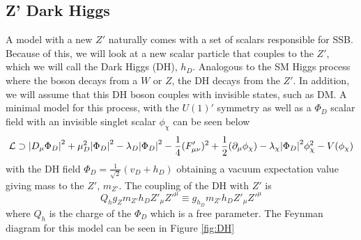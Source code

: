 \documentclass[12pt, a4paper]{book}
\begin{document}
\subsection{Z' Dark Higgs}
A model with a new $Z'$ naturally comes with a set of scalars responsible for SSB. Because of this, we will look at a new scalar particle that couples to the $Z'$, which we will call the Dark Higgs (DH), $h_D$. Analogous to the SM Higgs process where the boson decays from a $W$ or $Z$, the DH decays from the $Z'$. 
In addition, we will assume that this DH boson couples with invisible states, such as DM. A minimal model for this process, with the $U(1)'$ symmetry as well as a $\Phi_D$ scalar field with an invisible singlet scalar $\phi_\chi$ can be seen below
\begin{equation}
    \mathcal{L}\supset \abs{D_\mu\Phi_D}^2 + \mu_D^2\abs{\Phi_D}^2 -\lambda_D\abs{\Phi_D}^2-\frac{1}{4}(F'_{\mu\nu})^2 + \frac{1}{2}(\partial_\mu\phi_\chi)-\lambda_\chi\abs{\Phi_D}^2\phi_\chi^2 - V(\phi_\chi)
\end{equation}
with the DH field $\Phi_D =\frac{1}{\sqrt{2}}(v_D+h_D)$ obtaining a vacuum expectation value giving mass to the $Z'$, $m_{Z'}$. The coupling of the DH with $Z'$ is
\begin{equation}
    Q_hg_Zm_{Z'}h_DZ'_\mu Z'^\mu \equiv g_{h_D}m_{Z'}h_DZ'_\mu Z'^\mu
\end{equation}
where $Q_h$ is the charge of the $\Phi_D$ which is a free parameter. The Feynman diagram for this model can be seen in Figure \ref{fig:DH}
\end{document}
